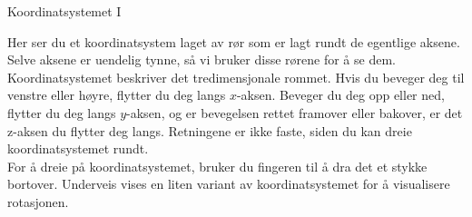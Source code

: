 \documentclass[no]{./../../common/SurferDesc}%
\begin{document}
\footnotesize
%


\begin{surferPage}
  \begin{surferTitle}Koordinatsystemet I \end{surferTitle}
   \begin{surferText}
   
Her ser du et koordinatsystem laget av rør som er lagt rundt de egentlige aksene. Selve aksene er uendelig tynne, så vi bruker disse rørene for å se dem.\\
Koordinatsystemet beskriver det tredimensjonale rommet. Hvis du beveger deg til venstre eller høyre, flytter du deg langs $x$-aksen. Beveger du deg opp eller ned, flytter du deg langs $y$-aksen, 
og er bevegelsen rettet framover eller bakover, er det z-aksen du flytter deg langs. Retningene er ikke faste, siden du kan dreie koordinatsystemet rundt. \\

\vspace{0.3cm}
For å dreie på koordinatsystemet, bruker du fingeren til å dra det et stykke bortover. Underveis vises en liten variant av koordinatsystemet for å visualisere rotasjonen. 
     \end{surferText}
\end{surferPage}
\end{document}
